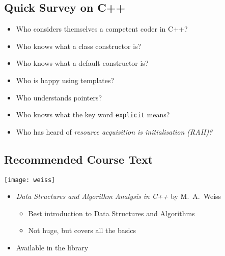 
\begin{slide}
\section{Quick Survey on C++}

\begin{PauseHighLight}
  \begin{itemize}
  \item Who considers themselves a competent coder in C++?\pause
  \item Who knows what a class constructor is?\pauseb
  \item Who knows what a default constructor is?\pauseb
  \item Who is happy using templates?\pauseb
  \item Who understands pointers?\pauseb
  \item Who knows what the key word \texttt{explicit} means?\pauseb
  \item Who has heard of \textit{resource acquisition is
      initialisation (RAII)?}\pauseb
  \end{itemize}
\end{PauseHighLight}


\end{slide}




\begin{slide}
\section{Recommended Course Text}

\begin{minipage}{10cm}
\texttt{[image: weiss]}
\end{minipage}\hfill
\begin{minipage}{12cm}
  \begin{PauseHighLight}
    \begin{itemize}
    \item \textit{Data Structures and Algorithm Analysis in C++} by
      M.~A.~Weiss\pause
      \begin{itemize}
      \item Best introduction to Data Structures and Algorithms\pause
      \item Not huge, but covers all the basics\pause
      \end{itemize}
    \item Available in the library\pause
    \end{itemize}
  \end{PauseHighLight}
\end{minipage}

\end{slide}


